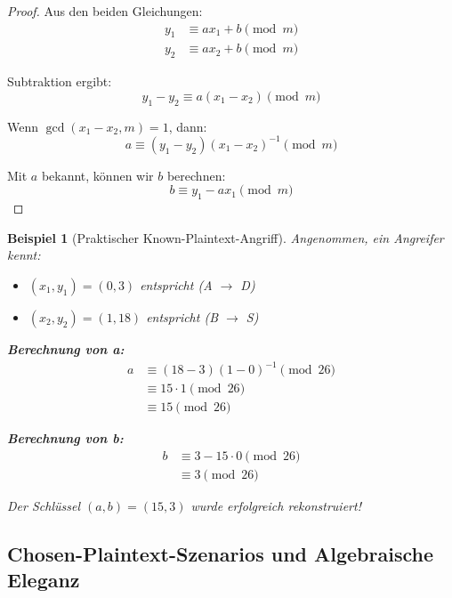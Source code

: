 ﻿\documentclass[12pt,a4paper]{article}
\newtheorem{example}{Beispiel}
\begin{document}
	\begin{proof}
		Aus den beiden Gleichungen:
		\begin{align}
			y_1 &\equiv ax_1 + b \pmod{m} \\
			y_2 &\equiv ax_2 + b \pmod{m}
		\end{align}
		
		Subtraktion ergibt:
		\begin{equation}
			y_1 - y_2 \equiv a(x_1 - x_2) \pmod{m}
		\end{equation}
		
		Wenn $\gcd(x_1 - x_2, m) = 1$, dann:
		\begin{equation}
			a \equiv (y_1 - y_2)(x_1 - x_2)^{-1} \pmod{m}
		\end{equation}
		
		Mit $a$ bekannt, können wir $b$ berechnen:
		\begin{equation}
			b \equiv y_1 - ax_1 \pmod{m}
		\end{equation}
	\end{proof}
	
	\begin{example}[Praktischer Known-Plaintext-Angriff]
		Angenommen, ein Angreifer kennt:
		\begin{itemize}
			\item $(x_1, y_1) = (0, 3)$ entspricht (A $\to$ D)
			\item $(x_2, y_2) = (1, 18)$ entspricht (B $\to$ S)
		\end{itemize}
		
		\textbf{Berechnung von a:}
		\begin{align}
			a &\equiv (18 - 3)(1 - 0)^{-1} \pmod{26} \\
			&\equiv 15 \cdot 1 \pmod{26} \\
			&\equiv 15 \pmod{26}
		\end{align}
		
		\textbf{Berechnung von b:}
		\begin{align}
			b &\equiv 3 - 15 \cdot 0 \pmod{26} \\
			&\equiv 3 \pmod{26}
		\end{align}
		
		Der Schlüssel $(a, b) = (15, 3)$ wurde erfolgreich rekonstruiert!
	\end{example}
	
	\subsection{Chosen-Plaintext-Szenarios und Algebraische Eleganz}
	
\end{document}
